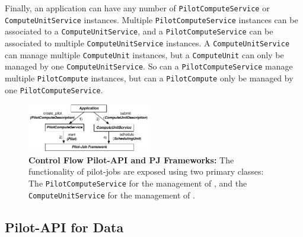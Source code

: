 \documentclass[conference]{IEEEtran}
\begin{document}
Finally, an application can have any number of \texttt{Pilot\-Compute\-Service} or
\texttt{Compute\-Unit\-Service} instances.
Multiple \texttt{Pilot\-Compute\-Service} instances can be associated to a
\texttt{Compute\-Unit\-Service}, and a \texttt{Pilot\-Compute\-Service} can be associated to
multiple \texttt{Compute\-Unit\-Service} instances.
A \texttt{Compute\-Unit\-Service} can manage multiple \texttt{Compute\-Unit}
instances, but a \texttt{Compute\-Unit} can only be managed by one
\texttt{Compute\-Unit\-Service}.
So can a \texttt{Pilot\-Compute\-Service} manage multiple
\texttt{Pilot\-Compute} instances, but can a \texttt{Pilot\-Compute} only be
managed by one \texttt{Pilot\-Compute\-Service}.


\begin{figure}[t]
	\centering
  \upp
		\includegraphics[width=0.48\textwidth]{../figures/pilot-api-flow.pdf}
	\caption{\textbf{Control Flow Pilot-API and PJ Frameworks:} The 
	functionality of pilot-jobs are exposed using two primary classes: The 
	\texttt{Pilot\-Compute\-Service} for the management 
	of \pilots, and the \texttt{Compute\-Unit\-Service} for the management of 
	\cus. \upp
	}
	\label{fig:figures_pilot_api_flow}
\end{figure}



\subsection{Pilot-API for Data}
\end{document}
